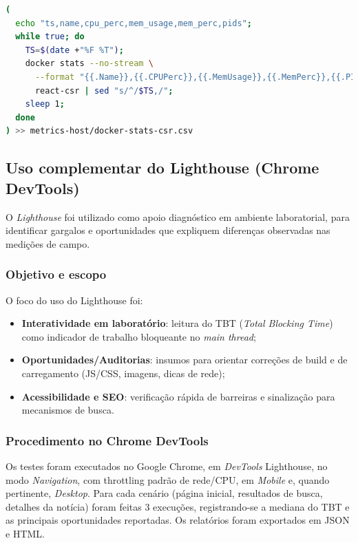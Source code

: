 \begin{lstlisting}[language=bash,caption={Captura de CPU/RAM do contêiner CSR e exportação para CSV}]
(
  echo "ts,name,cpu_perc,mem_usage,mem_perc,pids";
  while true; do
    TS=$(date +"%F %T");
    docker stats --no-stream \
      --format "{{.Name}},{{.CPUPerc}},{{.MemUsage}},{{.MemPerc}},{{.PIDs}}" \
      react-csr | sed "s/^/$TS,/";
    sleep 1;
  done
) >> metrics-host/docker-stats-csr.csv
\end{lstlisting}




\subsection{Uso complementar do Lighthouse (Chrome DevTools)}
\label{ssec:lighthouse}

O \textit{Lighthouse} foi utilizado como apoio diagnóstico em ambiente laboratorial, para identificar gargalos e oportunidades que expliquem diferenças observadas nas medições de campo.

\subsubsection{Objetivo e escopo}
O foco do uso do Lighthouse foi:
\begin{itemize}
  \item \textbf{Interatividade em laboratório}: leitura do TBT (\textit{Total Blocking Time}) como indicador de trabalho bloqueante no \textit{main thread};
  \item \textbf{Oportunidades/Auditorias}: insumos para orientar correções de build e de carregamento (JS/CSS, imagens, dicas de rede);
  \item \textbf{Acessibilidade e SEO}: verificação rápida de barreiras e sinalização para mecanismos de busca.
\end{itemize}

\subsubsection{Procedimento no Chrome DevTools}
Os testes foram executados no Google Chrome, em \textit{DevTools} \textrightarrow{} Lighthouse, no modo \textit{Navigation}, com throttling padrão de rede/CPU, em \textit{Mobile} e, quando pertinente, \textit{Desktop}. Para cada cenário (página inicial, resultados de busca, detalhes da notícia) foram feitas 3 execuções, registrando-se a mediana do TBT e as principais oportunidades reportadas. Os relatórios foram exportados em JSON e HTML.


